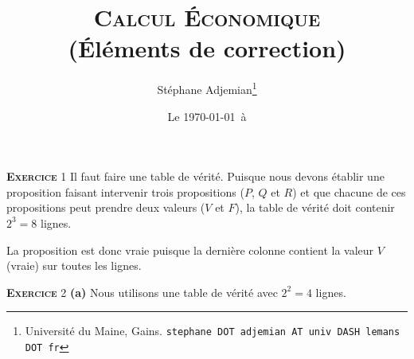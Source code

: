 \documentclass[10pt,a4paper,notitlepage]{article}
\newcommand{\exercice}[1]{\textsc{\textbf{Exercice}} #1}
\begin{document}
\title{\textsc{Calcul Économique}\\\textbf{(Éléments de correction)}}
\author{Stéphane Adjemian\thanks{Université du Maine, Gains. \texttt{stephane DOT adjemian AT univ DASH lemans DOT fr}}}
\date{Le \today\ à \thistime}

\maketitle

\exercice{1} Il faut faire une table de vérité. Puisque nous devons
établir une proposition faisant intervenir trois propositions ($P$,
$Q$ et $R$) et que chacune de ces propositions peut prendre deux
valeurs ($V$ et $F$), la table de vérité doit contenir $2^3=8$ lignes.

\begin{table}[H]
  \centering
{}
\end{table}

La proposition est donc vraie puisque la dernière colonne contient la
valeur $V$ (vraie) sur toutes les lignes.

\bigskip

\exercice{2} \textbf{(a)} Nous utilisons une table de vérité avec $2^2=4$ lignes.

\begin{table}[H]
  \centering
{}
\end{table}
\end{document}
